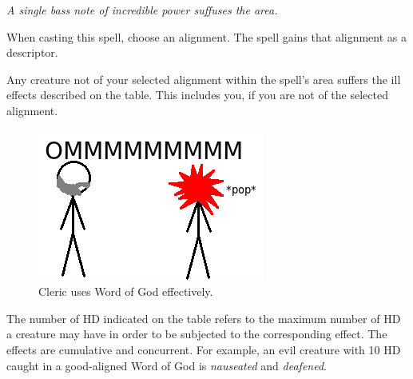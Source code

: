 \emph{A single bass note of incredible power suffuses the area.}

When casting this spell, choose an alignment. The spell gains that alignment as a descriptor.

Any creature not of your selected alignment within the spell's area suffers the ill effects
described on the  table. This includes you, if you are not of the selected alignment.
\begin{table}
\label{tab:WordOfGod}
\caption{Word of God}
\end{table}

\begin{figure}
  \caption{Cleric uses Word of God effectively.}
  \centering
    \includegraphics{Pics/WordOfGod.png}
\end{figure}

The number of HD indicated on the table refers to the maximum number of HD a creature may have in order to be subjected to the corresponding effect.
The effects are cumulative and concurrent.
For example, an evil creature with 10 HD caught in a good-aligned Word of God is \emph{nauseated} and \emph{deafened}.


